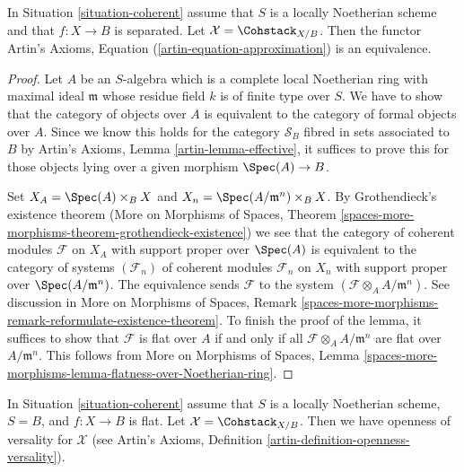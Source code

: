 \begin{lemma}
\label{lemma-coherent-existence}
In Situation \ref{situation-coherent} assume that $S$ is a locally Noetherian
scheme and that $f : X \to B$ is separated.
Let $\mathcal{X} = \Cohstack_{X/B}$. Then the functor
Artin's Axioms, Equation (\ref{artin-equation-approximation})
is an equivalence.
\end{lemma}

\begin{proof}
Let $A$ be an $S$-algebra which is a complete local Noetherian ring
with maximal ideal $\mathfrak m$
whose residue field $k$ is of finite type over $S$.
We have to show that the category of objects over $A$ is
equivalent to the category of formal objects over $A$.
Since we know this holds for the category $\mathcal{S}_B$
fibred in sets associated to $B$ by Artin's Axioms, 
Lemma \ref{artin-lemma-effective}, it suffices to prove this
for those objects lying over a given morphism $\Spec(A) \to B$.

\medskip\noindent
Set $X_A = \Spec(A) \times_B X$ and $X_n = \Spec(A/\mathfrak m^n) \times_B X$.
By Grothendieck's existence theorem
(More on Morphisms of Spaces, Theorem
\ref{spaces-more-morphisms-theorem-grothendieck-existence})
we see that the category of coherent modules $\mathcal{F}$
on $X_A$ with support proper over $\Spec(A)$ is equivalent
to the category of systems $(\mathcal{F}_n)$ of coherent modules
$\mathcal{F}_n$ on $X_n$ with support proper over
$\Spec(A/\mathfrak m^n)$. The equivalence sends $\mathcal{F}$
to the system $(\mathcal{F} \otimes_A A/\mathfrak m^n)$. See discussion in
More on Morphisms of Spaces, Remark
\ref{spaces-more-morphisms-remark-reformulate-existence-theorem}.
To finish the proof of the lemma, it suffices to show that
$\mathcal{F}$ is flat over $A$ if and only if all
$\mathcal{F} \otimes_A A/\mathfrak m^n$ are flat over $A/\mathfrak m^n$.
This follows from
More on Morphisms of Spaces, Lemma
\ref{spaces-more-morphisms-lemma-flatness-over-Noetherian-ring}.
\end{proof}

\begin{lemma}
\label{lemma-coherent-defo-thy}
In Situation \ref{situation-coherent} assume that
$S$ is a locally Noetherian scheme, $S = B$, and $f : X \to B$ is flat.
Let $\mathcal{X} = \Cohstack_{X/B}$. Then we have openness of
versality for $\mathcal{X}$ (see
Artin's Axioms, Definition \ref{artin-definition-openness-versality}).
\end{lemma}

